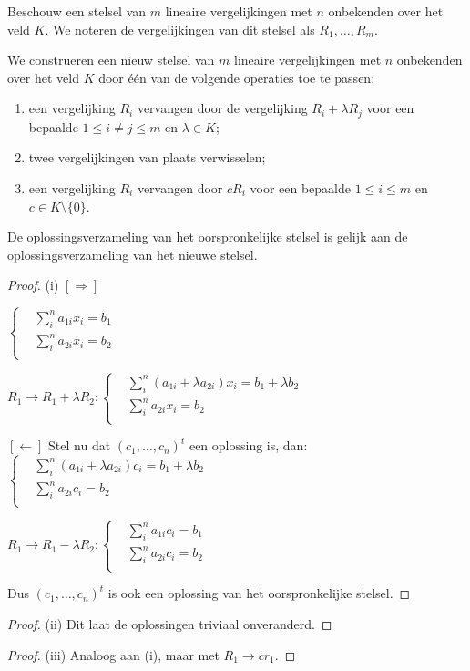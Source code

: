 \begin{lemma}[1.4.2]
    Beschouw een stelsel van $m$ lineaire vergelijkingen met $n$ onbekenden over het veld $K$. We noteren de vergelijkingen van dit stelsel als $R_1, \dots, R_m$.
    
    We construeren een nieuw stelsel van $m$ lineaire vergelijkingen met $n$ onbekenden over het veld $K$ door één van de volgende operaties toe te passen:
    \begin{enumerate}
        \item[(i)] een vergelijking $R_i$ vervangen door de vergelijking $R_i + \lambda R_j$ voor een bepaalde $1 \le i \neq j \le m$ en $\lambda \in K$;
        \item[(ii)] twee vergelijkingen van plaats verwisselen;
        \item[(iii)] een vergelijking $R_i$ vervangen door $cR_i$ voor een bepaalde $1 \le i \le m$ en $c \in K \setminus \{0\}$.
    \end{enumerate}
    De oplossingsverzameling van het oorspronkelijke stelsel is gelijk aan de oplossingsverzameling van het nieuwe stelsel.
\end{lemma}
\begin{proof}(i)
    \([\Rightarrow]\)

  \(
    \begin{cases}
       & \sum_i^n a_{1i}x_i = b_1\\
       & \sum_i^n a_{2i}x_i = b_2\\
    \end{cases}   
  \)

  \(R_1 \to R_1 + \lambda R_2:
    \begin{cases}
       & \sum_i^n \left(a_{1i} +\lambda a_{2i} \right)x_i = b_1 + \lambda b_2\\
       & \sum_i^n a_{2i}x_i = b_2\\
    \end{cases}   
  \)

  \([\leftarrow]\) Stel nu dat \((c_1,\dots,c_n)^t\) een oplossing is, dan:
  \(
  \begin{cases}
       & \sum_i^n \left(a_{1i} +\lambda a_{2i} \right)c_i = b_1 + \lambda b_2\\
       & \sum_i^n a_{2i}c_i = b_2\\
    \end{cases}  
  \)

   \(R_1 \to R_1 - \lambda R_2: 
   \begin{cases}
       & \sum_i^n a_{1i}c_i = b_1\\
       & \sum_i^n a_{2i}c_i = b_2\\
    \end{cases}  \)

    Dus \((c_1,\dots,c_n)^t\) is ook een oplossing van het oorspronkelijke stelsel.
\end{proof}
\begin{proof}(ii)
    Dit laat de oplossingen triviaal onveranderd.
\end{proof}
\begin{proof}(iii)
    Analoog aan (i), maar met \(R_1 \to c r_1\).
\end{proof}

